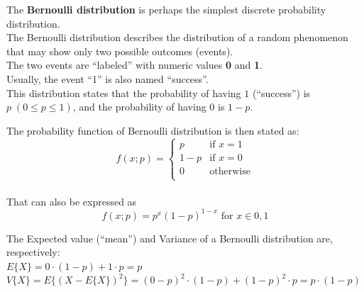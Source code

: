 

\begin{frame}
  \vspace{0.35cm}
  The \textbf{Bernoulli distribution} is perhaps the simplest discrete probability distribution.\\
  \vspace{0.45cm}
  The Bernoulli distribution describes the distribution of a random phenomenon that may show only two possible outcomes (events).\\ 
  \vspace{0.45cm}
  The two events are ``labeled'' with numeric values \textbf{0} and \textbf{1}.\\
  \vspace{0.45cm}
  Usually, the event ``1'' is also named ``success''.\\
  \vspace{0.45cm}
  This distribution states that the probability of having $1$ (``success'') is $p \; (0\le p \le 1)$, and the probability of having $0$ is $1-p$.\\
\end{frame}

\begin{frame}
  \vspace{0.5cm}
  The probability function of Bernoulli distribution is then stated as:
  $$
    f(x;p)=
    \begin{cases} p & \mbox{if }x=1\\
      1-p & \mbox{if }x=0\\
      0 & \mbox{otherwise}\\
    \end{cases}
  $$\\
  \vspace{1cm}
  That can also be expressed as
  $$
    f(x;p)=p^x(1-p)^{1-x} \mbox{     for } x \in {0,1}
  $$
\end{frame}

\begin{frame}
  The Expected value (``mean'') and Variance of a Bernoulli distribution are, respectively:\\
  \vspace*{1cm}
  $E\{X\}=0\cdot(1-p)+1\cdot p=p$\\
  \vspace*{1cm}
  $ V\{X\}=E\{(X-E\{X\})^2\}=(0-p)^2 \cdot (1-p) + (1-p)^2 \cdot p=p\cdot(1-p)$
\end{frame}


